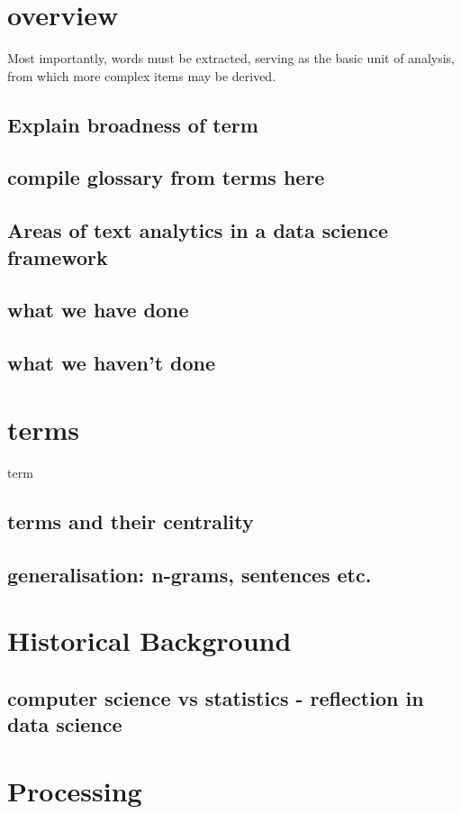 \documentclass[11pt, a4paper, oneside]{report}
\begin{document}
\section{overview}
\label{sec:overview}
Most importantly, words must be extracted, serving as the basic unit
of analysis, from which more complex items may be derived.
\subsection{Explain broadness of term}
\subsection{compile glossary from terms here}
\subsection{Areas of text analytics in a data science framework}
\subsection{what we have done}
\subsection{what we haven't done}

\section{terms}
\label{sec:terms}
\gls{term}
\subsection{terms and their centrality}
\subsection{generalisation: n-grams, sentences etc.}

\section{Historical Background}
\label{sec:hist-backgr}

\subsection{computer science vs statistics - reflection in data science}

\section{Processing}
\label{sec:processing}
\end{document}
